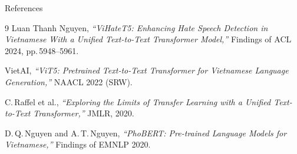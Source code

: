 \documentclass[10pt, aspectratio=169]{beamer}
\begin{document}
\begin{frame}{References}
  \begin{thebibliography}{9}
    Luan Thanh Nguyen,
    \textit{``ViHateT5: Enhancing Hate Speech Detection in Vietnamese With a Unified Text-to-Text Transformer Model,''}
    Findings of ACL 2024, pp.\,5948--5961.

    VietAI,
    \textit{``ViT5: Pretrained Text-to-Text Transformer for Vietnamese Language Generation,''}
    NAACL 2022 (SRW).

    C.\,Raffel et al.,
    \textit{``Exploring the Limits of Transfer Learning with a Unified Text-to-Text Transformer,''}
    JMLR, 2020.

    D.\,Q.\,Nguyen and A.\,T.\,Nguyen,
    \textit{``PhoBERT: Pre-trained Language Models for Vietnamese,''}
    Findings of EMNLP 2020.
  \end{thebibliography}
\end{frame}
\end{document}
